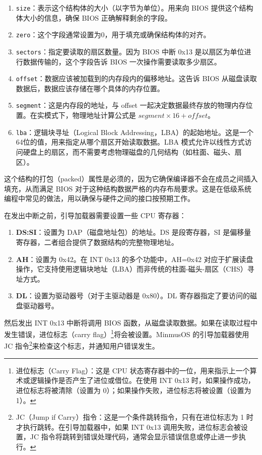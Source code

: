 \begin{enumerate}
    \item \texttt{size}：表示这个结构体的大小（以字节为单位）。用来向 BIOS 提供这个结构体大小的信息，确保 BIOS 正确解释剩余的字段。
    \item \texttt{zero}：这个字段通常设置为0，用于填充或确保结构体的对齐。
    \item \texttt{sectors}：指定要读取的扇区数量。因为 BIOS 中断 0x13 是以扇区为单位进行数据传输的，这个字段告诉 BIOS 一次操作需要读取多少扇区。
    \item \texttt{offset}：数据应该被加载到的内存段内的偏移地址。这告诉 BIOS 从磁盘读取数据后，数据应该存储在哪个具体的内存位置。
    \item \texttt{segment}：这是内存段的地址，与 offset 一起决定数据最终存放的物理内存位置。在实模式下，物理地址计算公式是 $segment \times 16 + offset$。
    \item \texttt{lba}：逻辑块寻址（Logical Block Addressing，LBA）的起始地址。这是一个64位的值，用来指定从哪个扇区开始读取数据。LBA 模式允许以线性方式访问硬盘上的扇区，而不需要考虑物理磁盘的几何结构（如柱面、磁头、扇区）。
\end{enumerate}

这个结构的打包（packed）属性是必须的，因为它确保编译器不会在成员之间插入填充，从而满足 BIOS 对于这种结构数据严格的内存布局要求。这是在低级系统编程中常见的做法，用以确保与硬件之间的接口按预期工作。

在发出中断之前，引导加载器需要设置一些 CPU 寄存器：

\begin{enumerate}
    \item \textbf{DS:SI}：设置为 DAP（磁盘地址包）的地址。DS 是段寄存器，SI 是偏移量寄存器，二者组合提供了数据结构的完整物理地址。
    \item \textbf{AH}：设置为 0x42。在 INT 0x13 的多个功能中，AH=0x42 对应于扩展读盘操作，它支持使用逻辑块地址（LBA）而非传统的柱面-磁头-扇区（CHS）寻址方式。
    \item \textbf{DL}：设置为驱动器号（对于主驱动器是 0x80）。DL 寄存器指定了要访问的磁盘驱动器号。
\end{enumerate}

然后发出 INT 0x13 中断将调用 BIOS 函数，从磁盘读取数据。如果在读取过程中发生错误，进位标志（carry flag）\footnote{进位标志（Carry Flag）：这是 CPU 状态寄存器中的一位，用来指示上一个算术或逻辑操作是否产生了进位或借位。在使用 INT 0x13 时，如果操作成功，进位标志将被清除（设置为 0）；如果操作失败，进位标志将被设置（设置为 1）。}将会被设置。MinmusOS 的引导加载器使用 JC 指令\footnote{JC（Jump if Carry）指令：这是一个条件跳转指令，只有在进位标志为 1 时才执行跳转。在引导加载器中，如果 INT 0x13 调用失败，进位标志会被设置，JC 指令将跳转到错误处理代码，通常会显示错误信息或停止进一步执行。}来检查这个标志，并通知用户错误发生。

